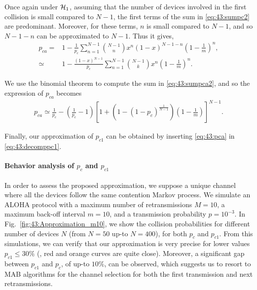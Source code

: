 Once again under $\mathcal{H}_{1}$, assuming that the number of devices involved in the first collision is small compared to $N-1$, the first terms of the sum in \eqref{eq:43:sumpc2} are predominant. Moreover, for these terms, $n$ is small compared to $N-1$, and so $N-1-n$ can be approximated to $N-1$. Thus it gives,
\begin{align}\label{eq:43:sumpca2}
	p_{ca} = & 1- \frac{1}{p_c}\sum_{n=1}^{N-1}{N-1 \choose n} x^n \left(1-x\right)^{N-1-n}\left( 1-\frac{1}{m}\right)^n,\nonumber\\
	\simeq & 1- \frac{\left(1-x\right)^{N-1}}{p_c}\sum_{n=1}^{N-1}{N-1 \choose k} x^n \left( 1-\frac{1}{m}\right)^n.
\end{align}

We use the binomial theorem to compute the sum in \eqref{eq:43:sumpca2}, and so the expression of $p_{ca}$ becomes
\begin{align}\label{eq:43:pca}
	p_{ca} \simeq \frac{1}{p_c} - \left(\frac{1}{p_c}-1\right)\left[ 1+\left(1-\left(1-p_c\right)^{\frac{1}{N-1}}\right)\left(1-\frac{1}{m}\right)\right]^{N-1}.
\end{align}

Finally, our approximation of $p_{c1}$ can be obtained by inserting \eqref{eq:43:pca} in \eqref{eq:43:decomppc1}.



\paragraph{Behavior analysis of $p_{c}$ and $p_{c1}$}\label{sub:43:numericalValidationPC1PC}

In order to assess the proposed approximation, we suppose a unique channel where all the devices follow the same contention Markov process.
We simulate an ALOHA protocol with a maximum number of retransmissions $M=10$, a maximum back-off interval $m=10$, and a transmission probability $p=10^{-3}$.
%
In Fig.~\ref{fig:43:Approximation_m10}, we show the collision probabilities for different number of devices $N$ (from $N=50$ up-to $N=400$), for both $p_{c}$ and $p_{c1}$.
%
From this simulations, we can verify that our approximation is very precise for lower values $p_{c1} \leq 30 \%$ (\ie, red and orange curves are quite close).
Moreover, a significant gap between $p_{c1}$ and $p_c$,
of up-to $10\%$, can be observed,
which suggests us to resort to MAB algorithms for the channel selection for both the first transmission and next retransmissions.

